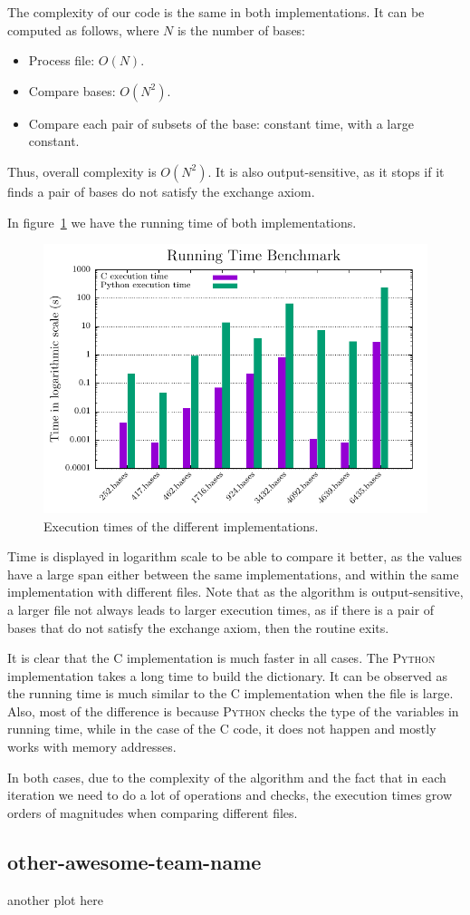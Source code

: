 \documentclass[11pt]{amsart}
\begin{document}
The complexity of our code is the same in both implementations.
It can be computed as follows, where $N$ is the number of bases:

\begin{itemize}
 \item Process file: $O(N)$.
 \item Compare bases: $O(N^2)$.
 \item Compare each pair of subsets of the base:
       constant time, with a large constant.
\end{itemize}

Thus, overall complexity is $O(N^2)$.
It is also output-sensitive,
as it stops if it finds a pair of bases do not satisfy the exchange axiom.

In figure~\ref{fig:Tresplans} we have the running time of both implementations.

\begin{figure}[h!]
    \centering
    \includegraphics[width=.75\textwidth]{./Tresplans/Tresplans_exec_time.pdf}
    \caption{Execution times of the different implementations.
    \label{fig:Tresplans}}
\end{figure}

Time is displayed in logarithm scale to be able to compare it better,
as the values have a large span either between the same implementations,
and within the same implementation with different files.
Note that as the algorithm is output-sensitive,
a larger file not always leads to larger execution times,
as if there is a pair of bases that do not satisfy the exchange axiom,
then the routine exits.

It is clear that the \textsc{C} implementation is much faster in all cases.
The \textsc{Python} implementation takes a long time to build the dictionary.
It can be observed as the running time is much similar to the
\textsc{C} implementation when the file is large.
Also, most of the difference is because \textsc{Python} checks the type
of the variables in running time,
while in the case of the \textsc{C} code,
it does not happen and mostly works with memory addresses.

In both cases,
due to the complexity of the algorithm
and the fact that in each iteration we need to do a lot of operations and checks,
the execution times grow orders of magnitudes when comparing different files.

\subsection{other-awesome-team-name}

another plot here
\end{document}
